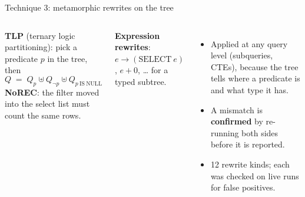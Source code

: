 \documentclass[aspectratio=169,10pt]{beamer}
\begin{document}
\begin{frame}{Technique 3: metamorphic rewrites on the tree}
\begin{columns}[T]
\small
\textbf{TLP} (ternary logic partitioning): pick a predicate $p$ in the tree, then
\[ Q \;=\; Q_{p} \uplus Q_{\neg p} \uplus Q_{p\ \mathrm{IS\ NULL}} \]
\textbf{NoREC}: the filter moved into the select list must count the same rows.

\textbf{Expression rewrites}: $e \rightarrow (\mathrm{SELECT}\ e)$, $e+0$, \dots{} for a typed subtree.
\small
\begin{itemize}
  \item Applied at \alert{any query level} (subqueries, CTEs), because the tree tells where a predicate is and what type it has.
  \item A mismatch is \textbf{confirmed} by re-running both sides before it is reported.
  \item 12 rewrite kinds; each was checked on live runs for false positives.
\end{itemize}
\end{columns}
\end{frame}
\end{document}
